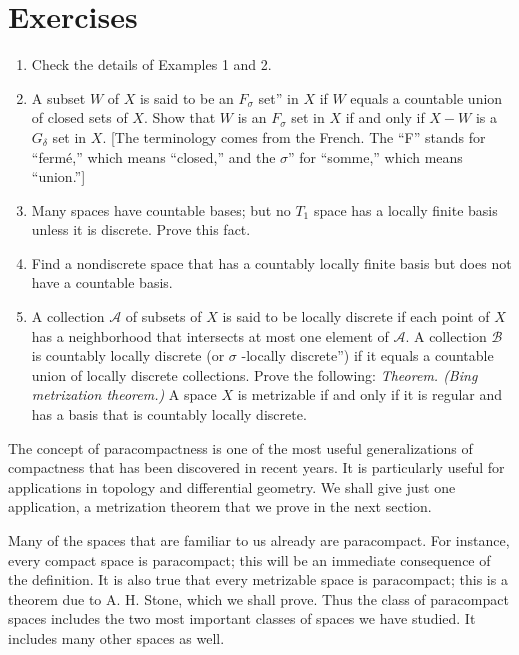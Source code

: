 \section*{Exercises}
\begin{enumerate}[itemsep=0.4em, parsep=0pt, topsep=0pt, partopsep=0pt, leftmargin=*, label=\arabic*., ref=\arabic*]
\item Check the details of Examples 1 and 2.
\item A subset \(W\) of \(X\) is said to be an \(F_{\sigma }\) set'' in \(X\) if \(W\) equals a countable union of closed sets of \(X\). Show that \(W\) is an \(F_{\sigma }\) set in \(X\) if and only if \(X - W\) is a \(G_{\delta }\) set in \(X\). [The terminology comes from the French. The ``F'' stands for ``fermé,'' which means ``closed,'' and the \(\sigma\)'' for ``somme,'' which means ``union.'']
\item Many spaces have countable bases; but no \(T_{1}\) space has a locally finite basis unless it is discrete. Prove this fact.
\item Find a nondiscrete space that has a countably locally finite basis but does not have a countable basis.
\item A collection \(\mathcal{A}\) of subsets of \(X\) is said to be locally discrete if each point of \(X\) has a neighborhood that intersects at most one element of \(\mathcal{A}\). A collection \(\mathcal{B}\) is countably locally discrete (or \(\sigma\) -locally discrete'') if it equals a countable union of locally discrete collections. Prove the following: \textsl{Theorem. (Bing metrization theorem.)} A space \(X\) is metrizable if and only if it is regular and has a basis that is countably locally discrete. 
\end{enumerate}

The concept of paracompactness is one of the most useful generalizations of compactness that has been discovered in recent years. It is particularly useful for applications in topology and differential geometry. We shall give just one application, a metrization theorem that we prove in the next section.

Many of the spaces that are familiar to us already are paracompact. For instance, every compact space is paracompact; this will be an immediate consequence of the definition. It is also true that every metrizable space is paracompact; this is a theorem due to A. H. Stone, which we shall prove. Thus the class of paracompact spaces includes the two most important classes of spaces we have studied. It includes many other spaces as well.

